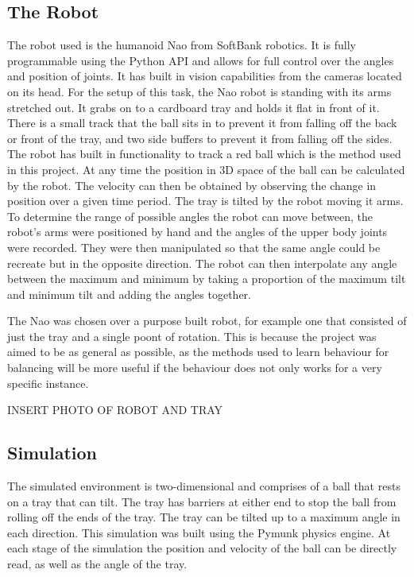 \documentclass[12pt,a4paper]{article}
\begin{document}
\subsection{The Robot}
The robot used is the humanoid Nao from SoftBank robotics. It is fully programmable using the Python API and allows for full control over the angles and position of joints. It has built in vision capabilities from the cameras located on its head. For the setup of this task, the Nao robot is standing with its arms stretched out. It grabs on to a cardboard tray and holds it flat in front of it. There is a small track that the ball sits in to prevent it from falling off the back or front of the tray, and two side buffers to prevent it from falling off the sides. The robot has built in functionality to track a red ball which is the method used in this project. At any time the position in 3D space of the ball can be calculated by the robot. The velocity can then be obtained by observing the change in position over a given time period. The tray is tilted by the robot moving it arms. To determine the range of possible angles the robot can move between, the robot's arms were positioned by hand and the angles of the upper body joints were recorded. They were then manipulated so that the same angle could be recreate but in the opposite direction. The robot can then interpolate any angle between the maximum and minimum by taking a proportion of the maximum tilt and minimum tilt and adding the angles together.

The Nao was chosen over a purpose built robot, for example one that consisted of just the tray and a single poont of rotation. This is because the project was aimed to be as general as possible, as the methods used to learn behaviour for balancing will be more useful if the behaviour does not only works for a very specific instance. 

INSERT PHOTO OF ROBOT AND TRAY

\subsection{Simulation}
The simulated environment is two-dimensional and comprises of a ball that rests on a tray that can tilt. The tray has barriers at either end to stop the ball from rolling off the ends of the tray. The tray can be tilted up to a maximum angle in each direction. This simulation was built using the Pymunk physics engine. At each stage of the simulation the position and velocity of the ball can be directly read, as well as the angle of the tray.  
\end{document}
